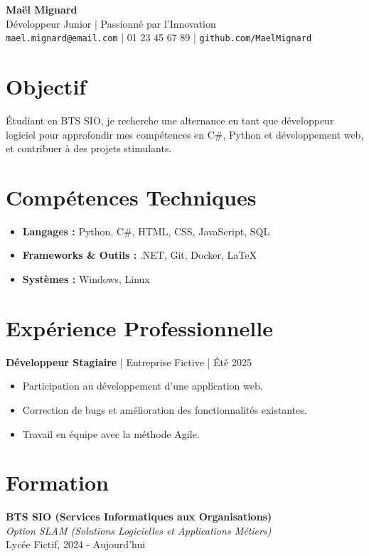 \documentclass[a4paper,10pt]{article}
\begin{document}
\pagestyle{empty}

\begin{center}
    {\Huge \textbf{Maël Mignard}} \\
    \vspace{5mm}
    Développeur Junior | Passionné par l'Innovation \\
    \texttt{mael.mignard@email.com} | 01 23 45 67 89 | \texttt{github.com/MaelMignard}
\end{center}

\section*{Objectif}
Étudiant en BTS SIO, je recherche une alternance en tant que développeur logiciel pour approfondir mes compétences en C\#, Python et développement web, et contribuer à des projets stimulants.

\section*{Compétences Techniques}
\begin{itemize}
    \item \textbf{Langages :} Python, C\#, HTML, CSS, JavaScript, SQL
    \item \textbf{Frameworks \& Outils :} .NET, Git, Docker, LaTeX
    \item \textbf{Systèmes :} Windows, Linux
\end{itemize}

\section*{Expérience Professionnelle}
\textbf{Développeur Stagiaire} | Entreprise Fictive | Été 2025
\begin{itemize}
    \item Participation au développement d'une application web.
    \item Correction de bugs et amélioration des fonctionnalités existantes.
    \item Travail en équipe avec la méthode Agile.
\end{itemize}

\section*{Formation}
\textbf{BTS SIO (Services Informatiques aux Organisations)} \\
\textit{Option SLAM (Solutions Logicielles et Applications Métiers)} \\
Lycée Fictif, 2024 - Aujourd'hui
\end{document}
